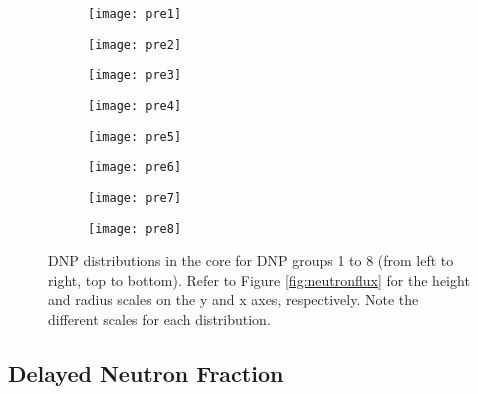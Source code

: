 \begin{figure}[t!]
    \centering
    \begin{subfigure}[t]{.243\textwidth}
        \centering
        \texttt{[image: pre1]}
    \end{subfigure}
    \begin{subfigure}[t]{.243\textwidth}
        \centering
        \texttt{[image: pre2]}
    \end{subfigure}
    \begin{subfigure}[t]{.243\textwidth}
        \centering
        \texttt{[image: pre3]}
    \end{subfigure}
    \begin{subfigure}[t]{.243\textwidth}
        \centering
        \texttt{[image: pre4]}
    \end{subfigure}
    \begin{subfigure}[t]{.243\textwidth}
        \centering
        \texttt{[image: pre5]}
    \end{subfigure}
    \begin{subfigure}[t]{.243\textwidth}
        \centering
        \texttt{[image: pre6]}
    \end{subfigure}
    \begin{subfigure}[t]{.243\textwidth}
        \centering
        \texttt{[image: pre7]}
    \end{subfigure}
    \begin{subfigure}[t]{.243\textwidth}
        \centering
        \texttt{[image: pre8]}
    \end{subfigure}
    \caption{\gls{DNP} distributions in the core for \gls{DNP} groups
    1 to 8 (from left to right, top to bottom). Refer to Figure \ref{fig:neutronflux} for the height and radius
    scales on the y and x axes, respectively. Note the different scales for
    each distribution.}
    \label{fig:dnp}
\end{figure}

\subsection{Delayed Neutron Fraction}

